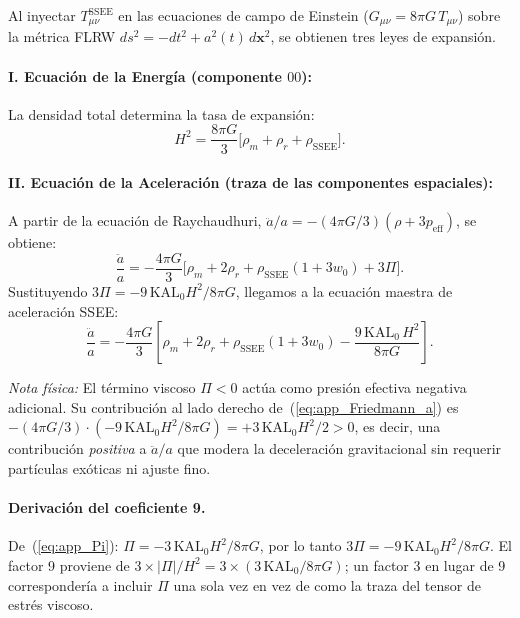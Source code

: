 Al inyectar $T_{\mu\nu}^{\mathrm{SSEE}}$ en las ecuaciones de campo de
Einstein ($G_{\mu\nu} = 8\pi G\,T_{\mu\nu}$) sobre la métrica FLRW
$ds^{2} = -dt^{2} + a^{2}(t)\,d\mathbf{x}^{2}$, se obtienen tres leyes
de expansión.

\paragraph{I. Ecuación de la Energía (componente $00$):}
La densidad total determina la tasa de expansión:
%
\begin{equation}
  H^{2} = \frac{8\pi G}{3}\bigl[\rho_{m} + \rho_{r} + \rho_{\mathrm{SSEE}}\bigr].
  \label{eq:app_Friedmann_H}
\end{equation}

\paragraph{II. Ecuación de la Aceleración (traza de las componentes espaciales):}
A partir de la ecuación de Raychaudhuri,
$\ddot{a}/a = -(4\pi G/3)(\rho + 3p_{\mathrm{eff}})$, se obtiene:
%
\begin{equation}
  \frac{\ddot{a}}{a}
    = -\frac{4\pi G}{3}
      \bigl[\rho_{m} + 2\rho_{r}
            + \rho_{\mathrm{SSEE}}(1 + 3w_{0}) + 3\Pi\bigr].
  \label{eq:app_acc_presubst}
\end{equation}
%
Sustituyendo $3\Pi = -9\,\mathrm{KAL}_{0}H^{2}/8\pi G$, llegamos a la
ecuación maestra de aceleración SSEE:
%
\begin{equation}
  \frac{\ddot{a}}{a}
    = -\frac{4\pi G}{3}
      \!\left[\rho_{m} + 2\rho_{r}
        + \rho_{\mathrm{SSEE}}(1 + 3w_{0})
        - \frac{9\,\mathrm{KAL}_{0}\,H^{2}}{8\pi G}
      \right].
  \label{eq:app_Friedmann_a}
\end{equation}

\textit{Nota física:}
El término viscoso $\Pi < 0$ actúa como presión efectiva negativa adicional.
Su contribución al lado derecho de~(\ref{eq:app_Friedmann_a}) es
$-(4\pi G/3)\cdot(-9\,\mathrm{KAL}_{0}H^{2}/8\pi G)
 = +3\,\mathrm{KAL}_{0}H^{2}/2 > 0$,
es decir, una contribución \emph{positiva} a $\ddot{a}/a$ que modera la
deceleración gravitacional sin requerir partículas exóticas ni ajuste fino.

\paragraph{Derivación del coeficiente 9.}
De~(\ref{eq:app_Pi}): $\Pi = -3\,\mathrm{KAL}_{0}H^{2}/8\pi G$,
por lo tanto $3\Pi = -9\,\mathrm{KAL}_{0}H^{2}/8\pi G$.
El factor 9 proviene de $3\times|\Pi|/H^{2}
= 3\times(3\,\mathrm{KAL}_{0}/8\pi G)$;
un factor 3 en lugar de 9 correspondería a incluir $\Pi$ una sola vez
en vez de como la traza del tensor de estrés viscoso.

